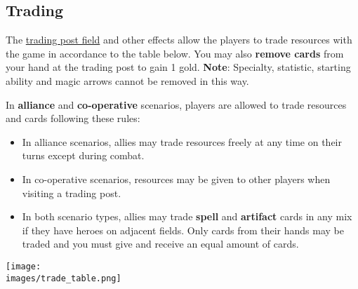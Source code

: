 \subsection*{\hypertarget{Trading}{Trading}}
The \hyperlink{Trading Post}{trading post field} and other effects allow the players to trade resources with the game in accordance to the table below.
You may also \textbf{remove cards} from your hand at the trading post to gain 1 gold.
\textbf{Note}: Specialty, statistic, starting ability and magic arrows cannot be removed in this way.\par
In \textbf{alliance} and \textbf{co-operative} scenarios, players are allowed to trade resources and cards following these rules:
\begin{itemize}
  \item In alliance scenarios, allies may trade resources freely at any time on their turns except during combat.
  \item In co-operative scenarios, resources may be given to other players when visiting a trading post.
  \item In both scenario types, allies may trade \textbf{spell} and \textbf{artifact} cards in any mix if they have heroes on adjacent fields.
    Only cards from their hands may be traded and you must give and receive an equal amount of cards.
\end{itemize}
\begin{center}
\texttt{[image: \\images/trade\_table.png]}
\end{center}

\clearpage

